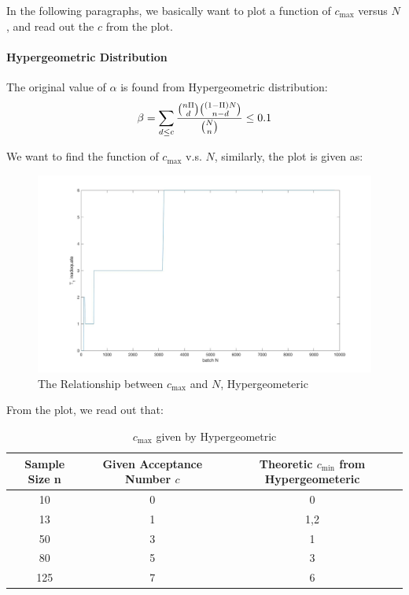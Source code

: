\documentclass[a4paper]{article}
\begin{document}
In the following paragraphs, we basically want to plot a function of $c_{\max}$ versus $N$, and read out the $c$ from the plot.

\paragraph{Hypergeometric Distribution}
The original value of $\alpha$ is found from Hypergeometric distribution:
$$\beta = \sum_{d\leq c} \displaystyle\frac{\tbinom{n\Pi}{d}\tbinom{(1-\Pi)N}{n-d}}{\tbinom{N}{n}} \leq 0.1$$

We want to find the function of $c_{\max}$ v.s. $N$, similarly, the plot is given as:
\begin{figure}[!htbp] 
\centering 
\includegraphics[width=1\linewidth]{beta-hyper.jpg}  
\caption{The Relationship between $c_{\max}$ and $N$, Hypergeometeric} 
\end{figure}

\newpage

From the plot, we read out that:
\begin{table}[!htbp]
  \centering
    \begin{tabular}{ccc}
    \hline
    Sample Size n & Given Acceptance Number $c$ & Theoretic $c_{\min}$ from Hypergeometeric \\
    \hline
    10    & 0     & 0 \\
    13    & \cellcolor[rgb]{ .851,  .882,  .949}1     & \cellcolor[rgb]{ .851,  .882,  .949}1,2 \\
    50    & \cellcolor[rgb]{ .851,  .882,  .949}3     & \cellcolor[rgb]{ .851,  .882,  .949}1 \\
    80    & \cellcolor[rgb]{ .851,  .882,  .949}5     & \cellcolor[rgb]{ .851,  .882,  .949}3 \\
    125   & \cellcolor[rgb]{ .851,  .882,  .949}7     & \cellcolor[rgb]{ .851,  .882,  .949}6 \\
    \hline
    \end{tabular}%
    \caption{$c_{\max}$ given by Hypergeometric}
\end{table}%
\end{document}
